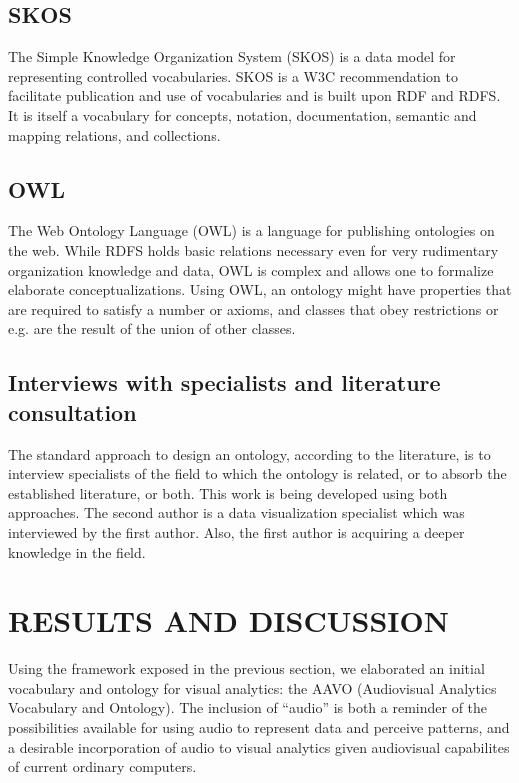\documentclass[12pt,fleqn]{article}
\begin{document}
\subsection{SKOS}
The Simple Knowledge Organization System (SKOS)
is a data model for representing controlled vocabularies.
SKOS is a W3C recommendation to facilitate publication
and use of vocabularies and is built upon RDF and RDFS.
It is itself a vocabulary for concepts, notation, documentation,
semantic and mapping relations, and collections.

\subsection{OWL}
The Web Ontology Language (OWL) is a language for publishing ontologies on the web.
While RDFS holds basic relations necessary even for very rudimentary organization
knowledge and data, OWL is complex and allows one to formalize elaborate conceptualizations.
Using OWL, an ontology might have properties that are required to satisfy a number or axioms,
and classes that obey restrictions or e.g. are the result of the union of other classes.

\subsection{Interviews with specialists and literature consultation}
The standard approach to design an ontology, according to the literature,
is to interview specialists of the field to which the ontology is related,
or to absorb the established literature, or both.
This work is being developed using both approaches.
The second author is a data visualization specialist which was
interviewed by the first author.
Also, the first author is acquiring a deeper knowledge in the field.

\section{RESULTS AND DISCUSSION}\label{sec:res}
Using the framework exposed in the previous section,
we elaborated an initial vocabulary and ontology for
visual analytics: the AAVO (Audiovisual Analytics Vocabulary and Ontology).
The inclusion of ``audio'' is both a reminder of the possibilities
available for using audio to represent data and perceive patterns,
and a desirable incorporation of audio to visual analytics given
audiovisual capabilites of current ordinary computers.
\end{document}
